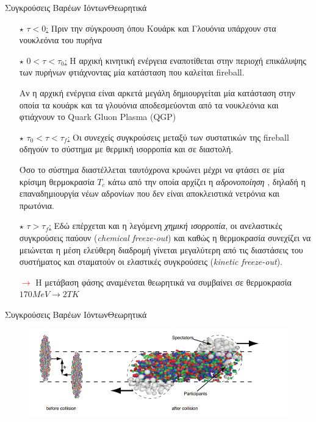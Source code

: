 \documentclass[18pt,notheorems,hyperref={pdfauthor=whatever}]{beamer}
\begin{document}
%
%
%
% 
% 
% 
\begin{frame}{Συγκρούσεις Βαρέων Ιόντων}{Θεωρητικά}
    \begin{itemize}
        \item[$\star$] \underline{$\tau<0$:} Πριν την σύγκρουση όπου Κουάρκ και Γλουόνια υπάρχουν στα νουκλεόνια του πυρήνα 
         \item[$\star$] \underline{$0<\tau<\tau_0$:} Η αρχική κινητική ενέργεια εναποτίθεται στην περιοχή επικάλυψης των πυρήνων φτιάχνοντας μία κατάσταση που καλείται fireball.
         
         Αν η αρχική ενέργεια είναι αρκετά μεγάλη δημιουργείται μία κατάσταση στην οποία τα κουάρκ και τα γλουόνια αποδεσμεύονται από τα νουκλεόνια και φτιάχνουν το Quark Gluon Plasma (QGP) \pause
          \item[$\star$] \underline{$\tau_0<\tau<\tau_f$:} Οι συνεχείς συγκρούσεις μεταξύ των συστατικών της fireball οδηγούν το σύστημα με θερμική ισορροπία και σε διαστολή.

          Όσο το σύστημα διαστέλλεται ταυτόχρονα κρυώνει μέχρι να φτάσει σε μία κρίσιμη θερμοκρασία \textbf{$T_c$} κάτω από την οποία αρχίζει η \textit{αδρονοποίηση} , δηλαδή η επαναδημιουργία νέων αδρονίων που δεν είναι αποκλειστικά νετρόνια και πρωτόνια. \pause
           \item[$\star$] \underline{$\tau>\tau_f$:} Εδώ επέρχεται και η λεγόμενη \textit{χημική ισορροπία}, οι ανελαστικές συγκρούσεις παύουν (\textit{chemical freeze-out}) και καθώς η θερμοκρασία συνεχίζει να μειώνεται η μέση ελεύθερη διαδρομή γίνεται μεγαλύτερη από τις διαστάσεις του συστήματος και σταματούν οι ελαστικές συγκρούσεις (\textit{kinetic freeze-out}). \pause
            \item[\textcolor{red}{$\rightarrow$}] Η μετάβαση φάσης αναμένεται θεωρητικά να συμβαίνει σε θερμοκρασία $170MeV \rightarrow 2TK$
    \end{itemize}
\end{frame}

\begin{frame}{Συγκρούσεις Βαρέων Ιόντων}{Θεωρητικά}
    \begin{figure}
        \centering
        \includegraphics{images/ion_collisions.png}
    \end{figure}
\end{frame}
\end{document}
